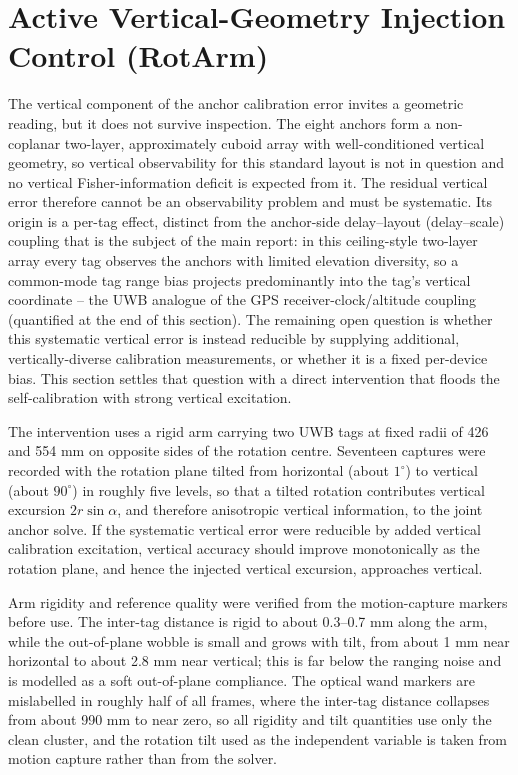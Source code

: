 \documentclass[11pt,a4paper]{article}
\begin{document}
\section{Active Vertical-Geometry Injection Control (RotArm)}

The vertical component of the anchor calibration error invites a geometric reading, but it does not survive inspection. The eight anchors form a non-coplanar two-layer, approximately cuboid array with well-conditioned vertical geometry, so vertical observability for this standard layout is not in question and no vertical Fisher-information deficit is expected from it. The residual vertical error therefore cannot be an observability problem and must be systematic. Its origin is a per-tag effect, distinct from the anchor-side delay--layout (delay--scale) coupling that is the subject of the main report: in this ceiling-style two-layer array every tag observes the anchors with limited elevation diversity, so a common-mode tag range bias projects predominantly into the tag's vertical coordinate -- the UWB analogue of the GPS receiver-clock/altitude coupling (quantified at the end of this section). The remaining open question is whether this systematic vertical error is instead reducible by supplying additional, vertically-diverse calibration measurements, or whether it is a fixed per-device bias. This section settles that question with a direct intervention that floods the self-calibration with strong vertical excitation.

The intervention uses a rigid arm carrying two UWB tags at fixed radii of 426 and 554 mm on opposite sides of the rotation centre. Seventeen captures were recorded with the rotation plane tilted from horizontal (about $1^\circ$) to vertical (about $90^\circ$) in roughly five levels, so that a tilted rotation contributes vertical excursion $2r\sin\alpha$, and therefore anisotropic vertical information, to the joint anchor solve. If the systematic vertical error were reducible by added vertical calibration excitation, vertical accuracy should improve monotonically as the rotation plane, and hence the injected vertical excursion, approaches vertical.

Arm rigidity and reference quality were verified from the motion-capture markers before use. The inter-tag distance is rigid to about 0.3--0.7 mm along the arm, while the out-of-plane wobble is small and grows with tilt, from about 1 mm near horizontal to about 2.8 mm near vertical; this is far below the ranging noise and is modelled as a soft out-of-plane compliance. The optical wand markers are mislabelled in roughly half of all frames, where the inter-tag distance collapses from about 990 mm to near zero, so all rigidity and tilt quantities use only the clean cluster, and the rotation tilt used as the independent variable is taken from motion capture rather than from the solver.
\end{document}

